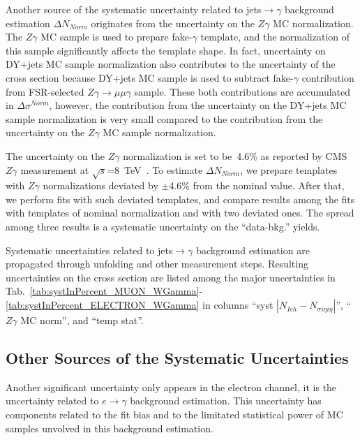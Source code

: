 Another source of the systematic uncertainty related to jets$\rightarrow\gamma$ background estimation $\Delta N_{Norm}$ originates from the  uncertainty on the $Z\gamma$ MC normalization. The $Z\gamma$ MC sample is used to prepare fake-$\gamma$ template, and the normalization of this sample significantly affects the template shape. In fact, uncertainty on DY+jets MC sample normalization also contributes to the uncertainty of the cross section because DY+jets MC sample is used to subtract fake-$\gamma$ contribution from FSR-selected $Z\gamma\rightarrow\mu\mu\gamma$ sample. These both contributions are accumulated in $\Delta \sigma^{Norm}$, however, the contribution from the uncertainty on the DY+jets MC sample normalization is very small compared to the contribution from the uncertainty on the $Z\gamma$ MC sample normalization.  

The uncertainty on the $Z\gamma$ normalization is set to be~4.6\% as reported by CMS $Z\gamma$ measurement at $\sqrt{s}$=8~TeV~\cite{ref_Zg8TeV}. To estimate $\Delta N_{Norm}$, we prepare templates with $Z\gamma$ normalizations deviated by $\pm$4.6\% from the nominal value. After that, we perform fits with such deviated templates, and compare results among the fits with templates of nominal normalization and with two deviated ones. The spread among three results is a systematic uncertainty on the ``data-bkg.'' yields. 

 Systematic uncertainties related to jets$\rightarrow\gamma$ background estimation are propagated through unfolding and other measurement steps. Resulting uncertainties on the cross section are listed among the major uncertainties in Tab.~\ref{tab:systInPercent_MUON_WGamma}-\ref{tab:systInPercent_ELECTRON_WGamma} in columns ``syst $|N_{Ich}-N_{\sigma{i\eta i\eta}}|$'', ``$Z\gamma$ MC norm'', and ``temp stat''.

\subsection{Other Sources of the Systematic Uncertainties}
\label{sec:Systematics_OtherSources}

Another significant uncertainty only appears in the electron channel, it is the uncertainty related to $e\rightarrow\gamma$ background estimation. This uncertainty has components related to the fit bias and to the limitated statistical power of MC samples unvolved in this background estimation. 

